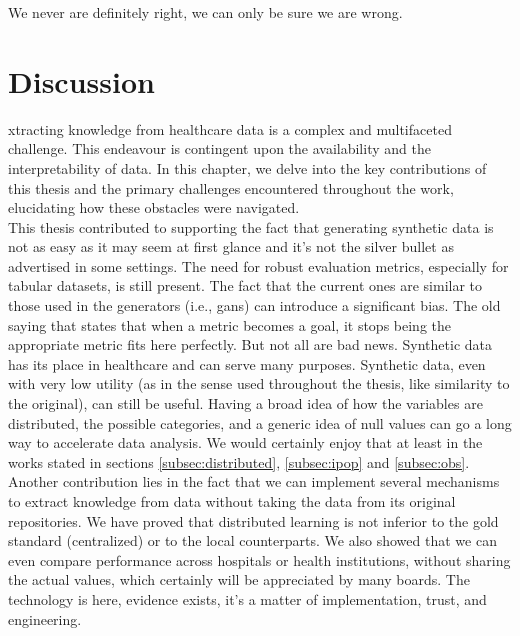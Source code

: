 
\begin{savequote}[80mm]
We never are definitely right, we can only be sure we are wrong.
\end{savequote}
\chapter{Discussion} \label{chap:disc}



xtracting knowledge from healthcare data is a complex and multifaceted challenge. This endeavour is contingent upon the availability and the interpretability of data. In this chapter, we delve into the key contributions of this thesis and the primary challenges encountered throughout the work, elucidating how these obstacles were navigated. \\

This thesis contributed to supporting the fact that generating synthetic data is not as easy as it may seem at first glance and it's not the silver bullet as advertised in some settings. The need for robust evaluation metrics, especially for tabular datasets, is still present. The fact that the current ones are similar to those used in the generators (i.e., \acp{gan}) can introduce a significant bias. The old saying that states that when a metric becomes a goal, it stops being the appropriate metric fits here perfectly. But not all are bad news. Synthetic data has its place in healthcare and can serve many purposes. Synthetic data, even with very low utility (as in the sense used throughout the thesis, like similarity to the original), can still be useful. Having a broad idea of how the variables are distributed, the possible categories, and a generic idea of null values can go a long way to accelerate data analysis. We would certainly enjoy that at least in the works stated in sections \ref{subsec:distributed}, \ref{subsec:ipop} and \ref{subsec:obs}. \\

Another contribution lies in the fact that we can implement several mechanisms to extract knowledge from data without taking the data from its original repositories. We have proved that distributed learning is not inferior to the gold standard (centralized) or to the local counterparts. We also showed that we can even compare performance across hospitals or health institutions, without sharing the actual values, which certainly will be appreciated by many boards. The technology is here, evidence exists, it's a matter of implementation, trust, and engineering. \\

